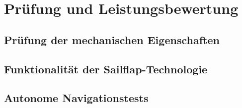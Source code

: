 

\chapter{Prüfung und Leistungsbewertung}
\label{chap:tests}


\section{Prüfung der mechanischen Eigenschaften}

\section{Funktionalität der Sailflap-Technologie}

\section{Autonome Navigationstests}
